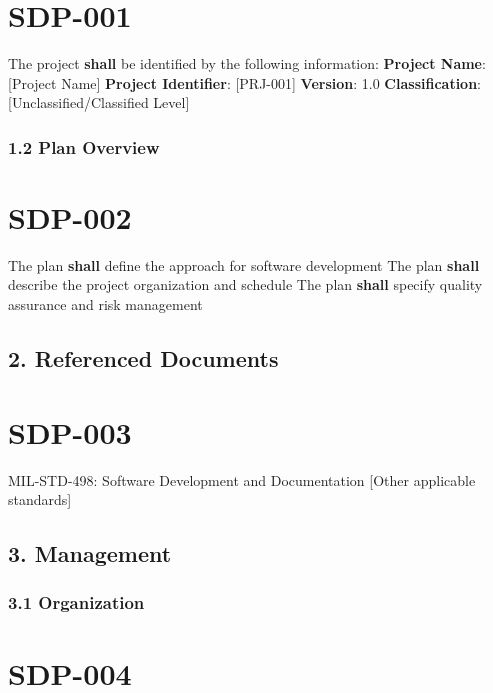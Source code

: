 \section{SDP-001}\label{SDP-001}

The project \textbf{shall} be identified by the following information:
\textbf{Project Name}: [Project Name]
\textbf{Project Identifier}: [PRJ-001]
\textbf{Version}: 1.0
\textbf{Classification}: [Unclassified/Classified Level]

\subsubsection{1.2 Plan Overview}

\section{SDP-002}\label{SDP-002}

The plan \textbf{shall} define the approach for software development
The plan \textbf{shall} describe the project organization and schedule
The plan \textbf{shall} specify quality assurance and risk management

\subsection{2. Referenced Documents}

\section{SDP-003}\label{SDP-003}

MIL-STD-498: Software Development and Documentation
[Other applicable standards]\\

\subsection{3. Management}

\subsubsection{3.1 Organization}

\section{SDP-004}\label{SDP-004}


